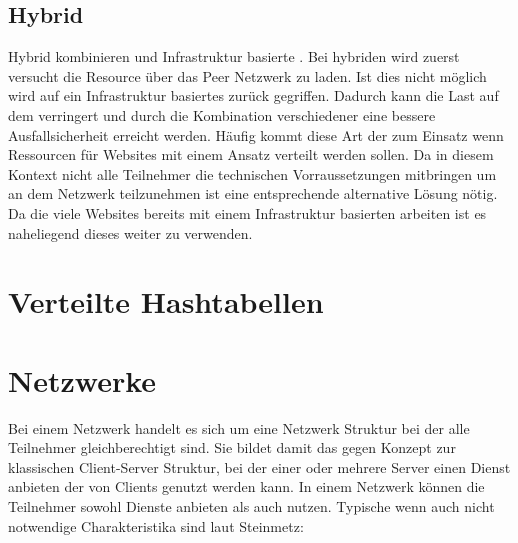 \subsection{Hybrid \cdns}
Hybrid \cdns kombinieren \pTp \cdns und Infrastruktur basierte \cdns. Bei hybriden \cdns wird zuerst versucht die Resource über das Peer Netzwerk zu laden. Ist dies nicht möglich wird auf ein Infrastruktur basiertes \cdn zurück gegriffen. Dadurch kann die Last auf dem \cdn verringert und durch die Kombination verschiedener \cdns eine bessere Ausfallsicherheit erreicht werden. Häufig kommt diese Art der \cdns zum Einsatz wenn Ressourcen für Websites mit einem \pTp Ansatz verteilt werden sollen. Da in diesem Kontext nicht alle Teilnehmer die technischen Vorraussetzungen mitbringen um an dem \pTp Netzwerk teilzunehmen ist eine entsprechende alternative Lösung nötig. Da die viele Websites bereits mit einem Infrastruktur basierten \cdn arbeiten ist es naheliegend dieses weiter zu verwenden.
\section{Verteilte Hashtabellen}

\section{\pTp Netzwerke}
Bei einem \pTp Netzwerk handelt es sich um eine Netzwerk Struktur bei der alle Teilnehmer gleichberechtigt sind. Sie bildet damit das gegen Konzept zur klassischen Client-Server Struktur, bei der einer oder mehrere Server einen Dienst anbieten der von Clients genutzt werden kann. In einem \pTp Netzwerk können die Teilnehmer sowohl Dienste anbieten als auch nutzen. Typische wenn auch nicht notwendige Charakteristika sind laut Steinmetz\cite{p2pBook2005}:

